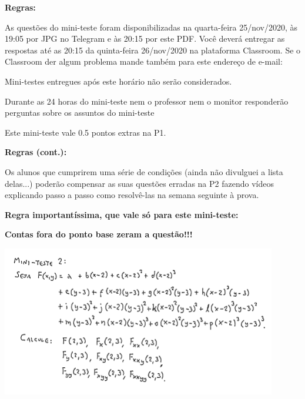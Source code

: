 \documentclass[oneside,12pt]{article}
\begin{document}

{\bf Regras:}

As questões do mini-teste foram disponibilizadas na quarta-feira
25/nov/2020, às 19:05 por JPG no Telegram e às 20:15 por este PDF.
Você deverá entregar as respostas  até as
20:15 da quinta-feira 26/nov/2020 na plataforma Classroom. Se o
Classroom der algum problema mande também para este endereço de
e-mail:

\ssk


\ssk

Mini-testes entregues após este horário não serão considerados.

Durante as 24 horas do mini-teste nem o professor nem o monitor
responderão perguntas sobre os assuntos do mini-teste 


Este mini-teste vale 0.5 pontos extras na P1.

\newpage

{\bf Regras (cont.):}

\ssk

Os alunos que cumprirem uma série de condições (ainda não divulguei a
lista delas...) poderão compensar as suas questões erradas na P2
fazendo vídeos explicando passo a passo como resolvê-las na semana
seguinte à prova. 

\bsk
\bsk

{\bf Regra importantíssima, que vale só para este mini-teste:}

{\bf Contas fora do ponto base zeram a questão!!!}



\newpage

\includegraphics[width=12cm]{2020-1-C3/20201125_C3_mt2.pdf}
\end{document}
